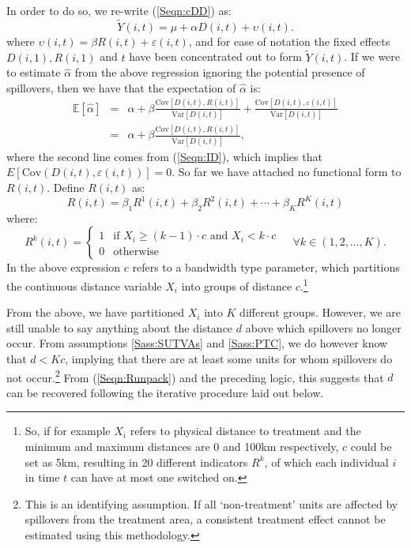 \documentclass{article}
\newcommand{\Var}{\mathrm{Var}}
\newcommand{\Cov}{\mathrm{Cov}}
\newcommand{\Bias}[2]{\frac{\Cov[#1,#2]}{\Var[#1]}}
\begin{document}
\begin{spacing}{1.3}
In order to do so, we re-write (\ref{Seqn:cDD}) as:
\begin{equation}
\label{Seqn:cDDconc}
\tilde{Y}(i,t)=\mu + \alpha D(i,t) + \upsilon(i,t).
\end{equation}
where $\upsilon(i,t)=\beta R(i,t)+\varepsilon(i,t)$, and for ease of notation
the fixed effects $D(i,1), R(i,1)$ and $t$ have been concentrated out to form
$\tilde{Y}(i,t)$.  If we were to estimate $\hat\alpha$ from the above regression
ignoring the potential presence of spillovers, then we have that the 
expectation of $\hat\alpha$ is:
\begin{eqnarray}
\label{Seqn:alphaExp}
\mathbb{E}[\hat\alpha] &=& \alpha + \beta\Bias{D(i,t)}{R(i,t)}+\Bias{D(i,t)}{\varepsilon(i,t)} \nonumber \\ 
              &=& \alpha + \beta\Bias{D(i,t)}{R(i,t)},
\end{eqnarray}
where the second line comes from (\ref{Seqn:ID}), which implies that
$E[\Cov(D(i,t),\varepsilon(i,t))]=0$.  So far we have attached no functional 
form to $R(i,t)$.  Define $R(i,t)$ as:
\begin{equation}
\label{Seqn:Runpack}
R(i,t) = \beta_1R^1(i,t)+\beta_2R^2(i,t)+ \cdots + \beta_KR^K(i,t)
\end{equation}  
where:
\begin{equation}
 R^k(i,t) =
  \begin{cases}
   1   & \text{if\ \ } X_i\geq(k-1)\cdot c \text{\ \ and \ } X_i<k\cdot c \\
   0   & \text{otherwise} 
  \end{cases}\ \ \ \ \ \forall k \in (1,2,\ldots,K).
\end{equation}
In the above expression $c$ refers to a bandwidth type parameter, which partitions
the continuous distance variable $X_i$ into groups of distance $c$.\footnote{So, if
for example $X_i$ refers to physical distance to treatment and the minimum and 
maximum distances are 0 and 100km respectively, $c$ could be set as 5km, resulting
in 20 different indicators $R^k$, of which each individual $i$ in time $t$ can
have at most one switched on.}

From the above, we have partitioned $X_i$ into $K$ different groups.  However, we
are still unable to say anything about the distance $d$ above which spillovers no 
longer occur.  From assumptions \ref{Sass:SUTVAs} and \ref{Sass:PTC}, we do however
know that $d<Kc$, implying that there are at least some units for whom spillovers
do not occur.\footnote{This is an identifying assumption.  If all `non-treatment'
units are affected by spillovers from the treatment area, a consistent treatment
effect cannot be estimated using this methodology.}  From (\ref{Seqn:Runpack}) and 
the preceding logic, this suggests that $d$ can be recovered following the iterative 
procedure laid out below.


\end{spacing}
\end{document}
